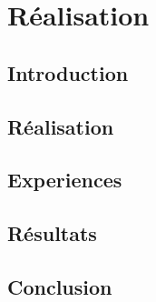 \chapter{Réalisation}

\section*{Introduction}

\section{Réalisation}

\section{Experiences}

\section{Résultats}

\section*{Conclusion}